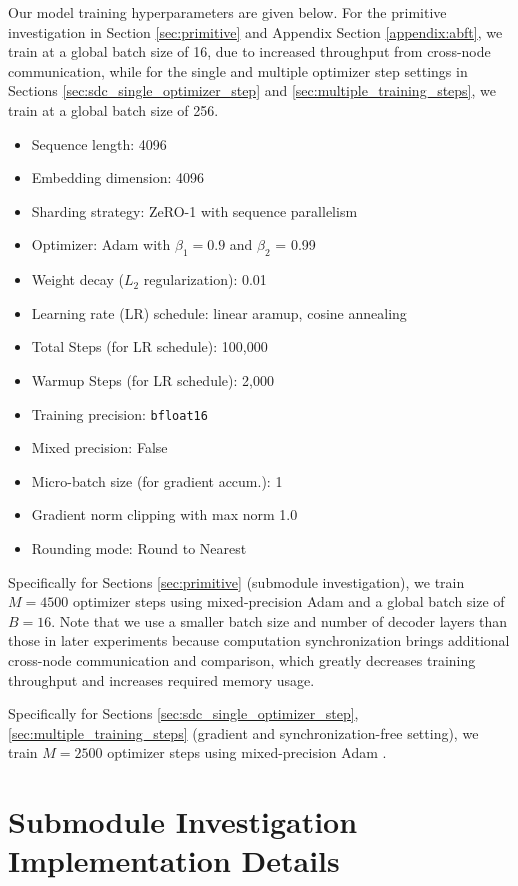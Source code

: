 Our model training hyperparameters are given below. For the primitive investigation in Section \ref{sec:primitive} and Appendix Section \ref{appendix:abft}, we train at a global batch size of 16, due to increased throughput from cross-node communication, while for the single and multiple optimizer step settings in Sections \ref{sec:sdc_single_optimizer_step} and \ref{sec:multiple_training_steps}, we train at a global batch size of 256.
\begin{itemize}
    \item Sequence length: 4096
    \item Embedding dimension: 4096
    \item Sharding strategy: ZeRO-1 with sequence parallelism
    \item Optimizer: Adam with $\beta_1 = 0.9$ and $\beta_2$ = 0.99
    \item Weight decay ($L_2$ regularization): 0.01
    \item Learning rate (LR) schedule: linear aramup, cosine annealing
    \item Total Steps (for LR schedule): 100,000
    \item Warmup Steps (for LR schedule): 2,000
    \item Training precision: \verb|bfloat16|
    \item Mixed precision: False
    \item Micro-batch size (for gradient accum.): 1
    \item Gradient norm clipping with max norm 1.0
    \item Rounding mode: Round to Nearest
\end{itemize}

Specifically for Sections \ref{sec:primitive} (submodule investigation), we train $M=4500$ optimizer steps using mixed-precision Adam \cite{micikevicius2018mixedprecisiontraining} and a global batch size of $B=16$. Note that we use a smaller batch size and number of decoder layers than those in later experiments because computation synchronization brings additional cross-node communication and comparison, which greatly decreases training throughput and increases required memory usage.

Specifically for Sections \ref{sec:sdc_single_optimizer_step}, \ref{sec:multiple_training_steps} (gradient and synchronization-free setting), we train $M=2500$ optimizer steps using mixed-precision Adam \cite{micikevicius2018mixedprecisiontraining}.

\section{Submodule Investigation Implementation Details} \label{appendix:primivite_investigation}

